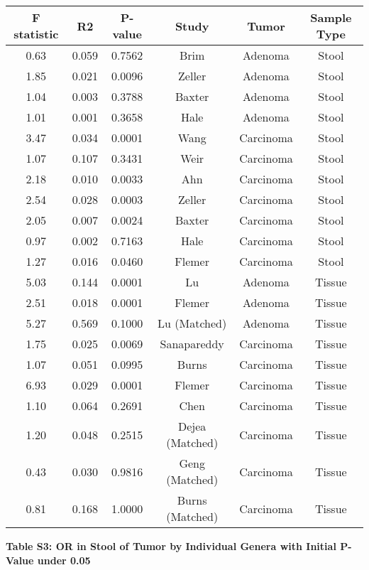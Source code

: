 \documentclass[12pt,]{article}
\begin{document}
\begin{longtable}[]{@{}cccccc@{}}
\toprule
F statistic & R2 & P-value & Study & Tumor & Sample Type\tabularnewline
\midrule
\endhead
0.63 & 0.059 & 0.7562 & Brim & Adenoma & Stool\tabularnewline
1.85 & 0.021 & 0.0096 & Zeller & Adenoma & Stool\tabularnewline
1.04 & 0.003 & 0.3788 & Baxter & Adenoma & Stool\tabularnewline
1.01 & 0.001 & 0.3658 & Hale & Adenoma & Stool\tabularnewline
3.47 & 0.034 & 0.0001 & Wang & Carcinoma & Stool\tabularnewline
1.07 & 0.107 & 0.3431 & Weir & Carcinoma & Stool\tabularnewline
2.18 & 0.010 & 0.0033 & Ahn & Carcinoma & Stool\tabularnewline
2.54 & 0.028 & 0.0003 & Zeller & Carcinoma & Stool\tabularnewline
2.05 & 0.007 & 0.0024 & Baxter & Carcinoma & Stool\tabularnewline
0.97 & 0.002 & 0.7163 & Hale & Carcinoma & Stool\tabularnewline
1.27 & 0.016 & 0.0460 & Flemer & Carcinoma & Stool\tabularnewline
5.03 & 0.144 & 0.0001 & Lu & Adenoma & Tissue\tabularnewline
2.51 & 0.018 & 0.0001 & Flemer & Adenoma & Tissue\tabularnewline
5.27 & 0.569 & 0.1000 & Lu (Matched) & Adenoma & Tissue\tabularnewline
1.75 & 0.025 & 0.0069 & Sanapareddy & Carcinoma & Tissue\tabularnewline
1.07 & 0.051 & 0.0995 & Burns & Carcinoma & Tissue\tabularnewline
6.93 & 0.029 & 0.0001 & Flemer & Carcinoma & Tissue\tabularnewline
1.10 & 0.064 & 0.2691 & Chen & Carcinoma & Tissue\tabularnewline
1.20 & 0.048 & 0.2515 & Dejea (Matched) & Carcinoma &
Tissue\tabularnewline
0.43 & 0.030 & 0.9816 & Geng (Matched) & Carcinoma &
Tissue\tabularnewline
0.81 & 0.168 & 1.0000 & Burns (Matched) & Carcinoma &
Tissue\tabularnewline
\bottomrule
\end{longtable}

\newpage

\textbf{Table S3: OR in Stool of Tumor by Individual Genera with Initial
P-Value under 0.05}

\footnotesize
\end{document}
